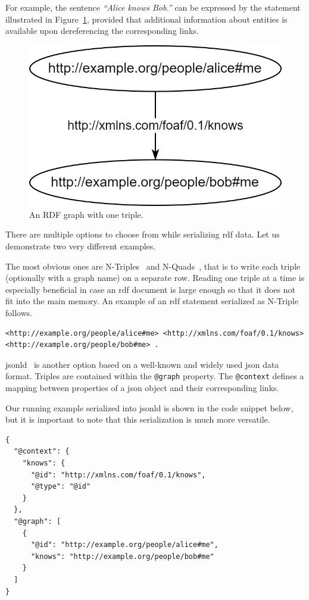 For example, the sentence \emph{``Alice knows Bob.''} can be expressed by the statement illustrated in Figure~\ref{fig:rdf-statement}, provided that additional information about entities is available upon dereferencing the corresponding links.

\begin{figure}[h!]
\centering
\includegraphics[width=0.45\linewidth]{img/concepts/rdf-statement.png}
\caption{An RDF graph with one triple.}
\label{fig:rdf-statement}
\end{figure}

There are multiple options to choose from while serializing \acs{rdf} data. Let us demonstrate two very different examples.

The most obvious ones are N-Triples~\cite{ntriples14} and N-Quads~\cite{nquads14}, that is to write each triple (optionally with a graph name) on a separate row. Reading one triple at a time is especially beneficial in case an \acs{rdf} document is large enough so that it does not fit into the main memory. An example of an \acs{rdf} statement serialized as N-Triple follows.

\begin{verbatim}
<http://example.org/people/alice#me> <http://xmlns.com/foaf/0.1/knows> <http://example.org/people/bob#me> .
\end{verbatim}

\ac{jsonld}~\cite{jsonld20} is another option based on a well-known and widely used \ac{json} data format. Triples are contained within the \texttt{@graph} property. The \texttt{@context} defines a mapping between properties of a \acs{json} object and their corresponding links.

Our running example serialized into \acs{jsonld} is shown in the code snippet below, but it is important to note that this serialization is much more versatile.

\begin{verbatim}
{
  "@context": {
    "knows": {
      "@id": "http://xmlns.com/foaf/0.1/knows",
      "@type": "@id"
    }
  },
  "@graph": [
    {
      "@id": "http://example.org/people/alice#me",
      "knows": "http://example.org/people/bob#me"
    }
  ]
}
\end{verbatim}

